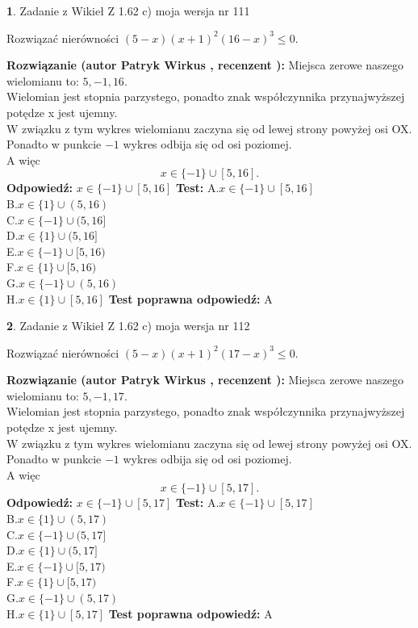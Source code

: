 \documentclass[12pt, a4paper]{article}
\theoremstyle{definition} %
\newtheorem{zad}{}
\newcommand{\zadStart}[1]{\begin{zad}#1\newline}
\newcommand{\zadStop}{\end{zad}}
\newcommand{\rozwStart}[2]{\noindent \textbf{Rozwiązanie (autor #1 , recenzent #2): }\newline}
\newcommand{\rozwStop}{\newline}
\newcommand{\odpStart}{\noindent \textbf{Odpowiedź:}\newline}
\newcommand{\odpStop}{\newline}
\newcommand{\testStart}{\noindent \textbf{Test:}\newline}
\newcommand{\testStop}{\newline}
\newcommand{\kluczStart}{\noindent \textbf{Test poprawna odpowiedź:}\newline}
\newcommand{\kluczStop}{\newline}
\begin{document}
\zadStart{Zadanie z Wikieł Z 1.62 c) moja wersja nr 111}

Rozwiązać nierówności $(5-x)(x+1)^{2}(16-x)^{3}\le0$.
\zadStop
\rozwStart{Patryk Wirkus}{}
Miejsca zerowe naszego wielomianu to: $5, -1, 16$.\\
Wielomian jest stopnia parzystego, ponadto znak współczynnika przy\linebreak najwyższej potędze x jest ujemny.\\ W związku z tym wykres wielomianu zaczyna się od lewej strony powyżej osi OX.\\
Ponadto w punkcie $-1$ wykres odbija się od osi poziomej.\\
A więc $$x \in \{-1\} \cup [5,16].$$
\rozwStop
\odpStart
$x \in \{-1\} \cup [5,16]$
\odpStop
\testStart
A.$x \in \{-1\} \cup [5,16]$\\
B.$x \in \{1\} \cup (5,16)$\\
C.$x \in \{-1\} \cup (5,16]$\\
D.$x \in \{1\} \cup (5,16]$\\
E.$x \in \{-1\} \cup [5,16)$\\
F.$x \in \{1\} \cup [5,16)$\\
G.$x \in \{-1\} \cup (5,16)$\\
H.$x \in \{1\} \cup [5,16]$
\testStop
\kluczStart
A
\kluczStop



\zadStart{Zadanie z Wikieł Z 1.62 c) moja wersja nr 112}

Rozwiązać nierówności $(5-x)(x+1)^{2}(17-x)^{3}\le0$.
\zadStop
\rozwStart{Patryk Wirkus}{}
Miejsca zerowe naszego wielomianu to: $5, -1, 17$.\\
Wielomian jest stopnia parzystego, ponadto znak współczynnika przy\linebreak najwyższej potędze x jest ujemny.\\ W związku z tym wykres wielomianu zaczyna się od lewej strony powyżej osi OX.\\
Ponadto w punkcie $-1$ wykres odbija się od osi poziomej.\\
A więc $$x \in \{-1\} \cup [5,17].$$
\rozwStop
\odpStart
$x \in \{-1\} \cup [5,17]$
\odpStop
\testStart
A.$x \in \{-1\} \cup [5,17]$\\
B.$x \in \{1\} \cup (5,17)$\\
C.$x \in \{-1\} \cup (5,17]$\\
D.$x \in \{1\} \cup (5,17]$\\
E.$x \in \{-1\} \cup [5,17)$\\
F.$x \in \{1\} \cup [5,17)$\\
G.$x \in \{-1\} \cup (5,17)$\\
H.$x \in \{1\} \cup [5,17]$
\testStop
\kluczStart
A
\kluczStop
\end{document}
